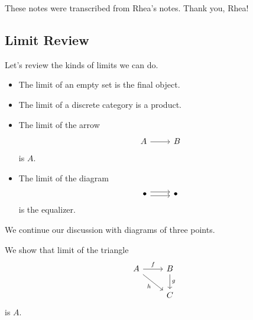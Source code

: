 \documentclass[../notes.tex]{subfiles}
\begin{document}

These notes were transcribed from Rhea's notes. Thank you, Rhea!

\subsection{Limit Review}
Let's review the kinds of limits we can do.
\begin{itemize}
	\item The limit of an empty set is the final object.
	\item The limit of a discrete category is a product.
	\item The limit of the arrow
	\[\begin{tikzcd}
		A & B
		\arrow[from=1-1, to=1-2]
	\end{tikzcd}\]
	is $A$.
	\item The limit of the diagram
	\[\begin{tikzcd}
		\bullet & \bullet
		\arrow[shift right=1, from=1-1, to=1-2]
		\arrow[shift left=1, from=1-1, to=1-2]
	\end{tikzcd}\]
	is the equalizer.
\end{itemize}
We continue our discussion with diagrams of three points.
\begin{exe}
	We show that limit of the triangle
	\[\begin{tikzcd}
		A & B \\
		& C
		\arrow["f", from=1-1, to=1-2]
		\arrow["g", from=1-2, to=2-2]
		\arrow["h"', from=1-1, to=2-2]
	\end{tikzcd}\]
	is $A$.
\end{exe}
\end{document}
